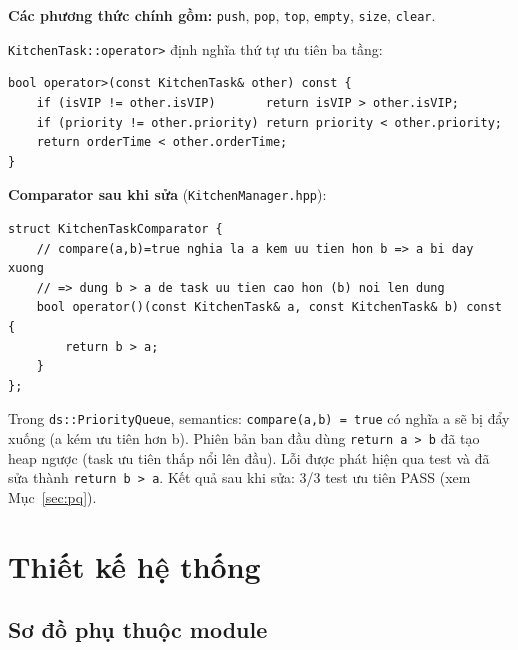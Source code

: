 \documentclass[12pt, a4paper]{article}
\begin{document}
\textbf{Các phương thức chính gồm:} \texttt{push}, \texttt{pop}, \texttt{top}, \texttt{empty},
\texttt{size}, \texttt{clear}.

\texttt{KitchenTask::operator>} định nghĩa thứ tự ưu tiên ba tầng:
\begin{lstlisting}
bool operator>(const KitchenTask& other) const {
    if (isVIP != other.isVIP)       return isVIP > other.isVIP;
    if (priority != other.priority) return priority < other.priority;
    return orderTime < other.orderTime;
}
\end{lstlisting}

\textbf{Comparator sau khi sửa} (\texttt{KitchenManager.hpp}):
\begin{lstlisting}
struct KitchenTaskComparator {
    // compare(a,b)=true nghia la a kem uu tien hon b => a bi day xuong
    // => dung b > a de task uu tien cao hon (b) noi len dung
    bool operator()(const KitchenTask& a, const KitchenTask& b) const {
        return b > a;
    }
};
\end{lstlisting}

\begin{notebox}
  Trong \texttt{ds::PriorityQueue}, semantics: \texttt{compare(a,b) = true} có nghĩa a sẽ bị
  đẩy xuống (a kém ưu tiên hơn b). Phiên bản ban đầu dùng \texttt{return a > b} đã tạo heap
  ngược (task ưu tiên thấp nổi lên đầu). Lỗi được phát hiện qua test và đã sửa thành
  \texttt{return b > a}. Kết quả sau khi sửa: 3/3 test ưu tiên PASS (xem Mục~\ref{sec:pq}).
\end{notebox}

\section{Thiết kế hệ thống}

\subsection{Sơ đồ phụ thuộc module}
\end{document}
